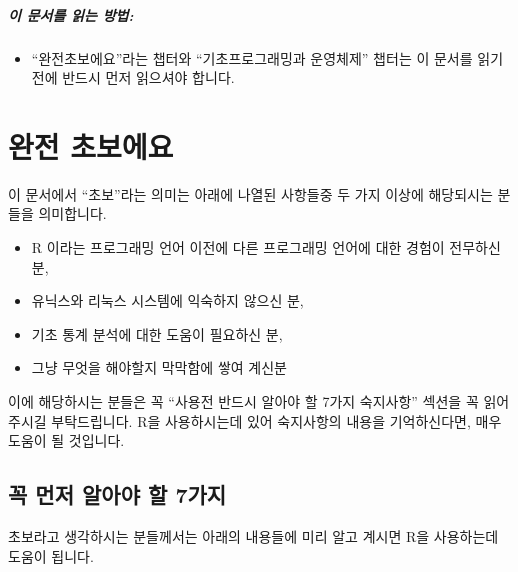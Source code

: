 \paragraph{이 문서를 읽는 방법:} 
\begin{itemize}
\item ``완전초보에요''라는 챕터와 ``기초프로그래밍과 운영체제'' 챕터는 이 문서를 읽기 전에 반드시 먼저 읽으셔야 합니다.  
\end{itemize}

%
%

\chapter{완전 초보에요}

이 문서에서 ``초보''라는 의미는 아래에 나열된 사항들중 두 가지 이상에 해당되시는 분들을 의미합니다. 

\begin{itemize}
\item R 이라는 프로그래밍 언어 이전에 다른 프로그래밍 언어에 대한 경험이 전무하신 분,
\item 유닉스와 리눅스 시스템에 익숙하지 않으신 분,
\item 기초 통계 분석에 대한 도움이 필요하신 분,
\item 그냥 무엇을 해야할지 막막함에 쌓여 계신분 
\end{itemize}

이에 해당하시는 분들은 꼭 ``사용전 반드시 알아야 할 7가지 숙지사항'' 섹션을 꼭 읽어주시길 부탁드립니다.
R을 사용하시는데 있어 숙지사항의 내용을 기억하신다면, 매우 도움이 될 것입니다. 


\section{꼭 먼저 알아야 할 7가지}

초보라고 생각하시는 분들께서는 아래의 내용들에 미리 알고 계시면 R을 사용하는데 도움이 됩니다.


